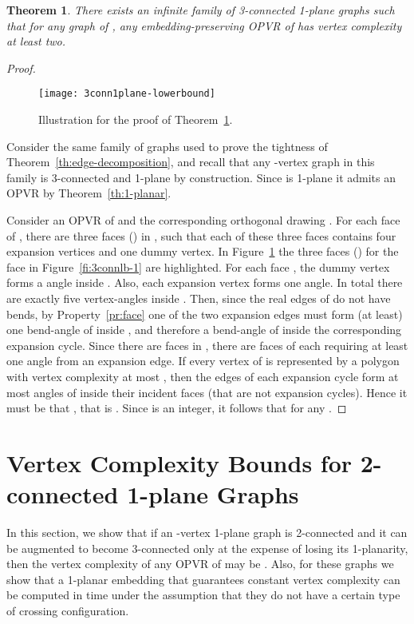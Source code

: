 \documentclass{article}
\newtheorem{theorem}{Theorem}
\newcommand{\opvr}{OPVR\xspace}
\begin{document}
\begin{theorem}\label{th:3conn-lb}
There exists an infinite family  of 3-connected 1-plane graphs such that for any graph  of , any embedding-preserving \opvr of  has vertex complexity at least two.
\end{theorem}
\begin{proof}

\begin{figure}[t]
    \centering
    \texttt{[image: 3conn1plane-lowerbound]}
    \caption{ Illustration for the proof of Theorem~\ref{th:3conn-lb}.}\label{fi:3connlb-2}
\end{figure}


Consider the same family of graphs used to prove the tightness of Theorem~\ref{th:edge-decomposition}, and recall that any -vertex graph  in this family is 3-connected and 1-plane by construction. Since  is 1-plane it admits an \opvr by Theorem~\ref{th:1-planar}.

Consider an \opvr of  and the corresponding orthogonal drawing . For each face  of , there are three faces  () in , such that each of these three faces contains four expansion vertices and one dummy vertex. In Figure~\ref{fi:3connlb-2} the three faces  () for the face  in Figure~\ref{fi:3connlb-1} are highlighted. For each face , the dummy vertex forms a  angle inside . Also, each expansion vertex forms one  angle. In total there are exactly five  vertex-angles inside .  Then, since the real edges of  do not have bends, by Property~\ref{pr:face} one of the two expansion edges must form (at least) one bend-angle of  inside , and therefore a bend-angle of  inside the corresponding expansion cycle. Since there are  faces in , there are  faces of  each requiring at least one  angle from an expansion edge. If every vertex of  is represented by a polygon with vertex complexity at most , then the edges of each expansion cycle form at most  angles of  inside their incident faces (that are not expansion cycles). Hence it must be that , that is . Since  is an integer, it follows that  for any .
\end{proof}



\section{Vertex Complexity Bounds for 2-connected 1-plane Graphs}\label{se:2conn-bounds}

In this section, we show that if an -vertex 1-plane graph  is 2-connected and it can be augmented to become 3-connected only at the expense of losing its 1-planarity, then the vertex complexity of any \opvr of  may be . Also, for these graphs we show that a 1-planar embedding that guarantees constant vertex complexity can be computed in  time under the assumption that they do not have a certain type of crossing configuration.
\end{document}
